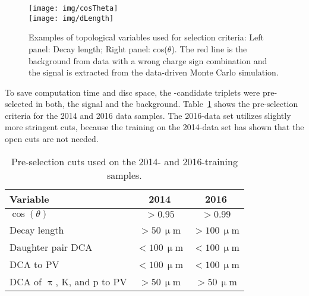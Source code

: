 \begin{figure}[!htb]
\centering
\texttt{[image: img/cosTheta]}\\[1cm]
\texttt{[image: img/dLength]}
\caption[Examples of topological variables used for selection criteria.]{\label{fig:optimization}Examples of topological variables used for selection criteria: Left panel: Decay length; Right panel: cos($\theta$)\@. The red line is the background from data with a wrong charge sign combination and the signal is extracted from the data-driven Monte Carlo simulation.}

\end{figure}

To save computation time and disc space, the \Lambdac-candidate triplets were pre-selected in both, the signal and the background. Table~\ref{tab:preoptimizationCuts} shows the pre-selection criteria for the 2014 and 2016 data samples. The 2016-data set utilizes slightly more stringent cuts, because the training on the 2014-data set has shown that the open cuts are not needed.

\begin{table}[!htb]
\caption[Pre-selection cuts used on the 2014- and 2016-training samples.]{\label{tab:preoptimizationCuts} Pre-selection cuts used on the 2014- and 2016-training samples. }
\begin{center}

\begin{tabular}{lcc}
\toprule
Variable & 2014 & 2016 \\
\midrule
$\cos(\theta)$ & $> 0.95$ & $> 0.99$ \\
Decay length & $> 50\,\upmu$m & $> 100\,\upmu$m \\
Daughter pair DCA & $< 100\,\upmu$m & $< 100\,\upmu$m \\
DCA to PV & $< 100\,\upmu$m &  $< 100\,\upmu$m \\
DCA of $\uppi$, K, and p to PV & $> 50\,\upmu$m & $> 50\,\upmu$m \\
\bottomrule
\end{tabular}

\end{center}
\end{table}

